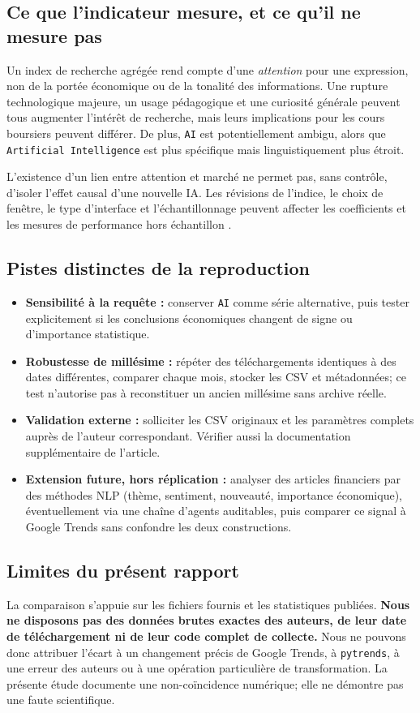 \documentclass[11pt,a4paper]{article}
\begin{document}
\subsection{Ce que l'indicateur mesure, et ce qu'il ne mesure pas}
Un index de recherche agrégée rend compte d'une \emph{attention} pour une expression, non de la portée économique ou de la tonalité des informations. Une rupture technologique majeure, un usage pédagogique et une curiosité générale peuvent tous augmenter l'intérêt de recherche, mais leurs implications pour les cours boursiers peuvent différer. De plus, \texttt{AI} est potentiellement ambigu, alors que \texttt{Artificial Intelligence} est plus spécifique mais linguistiquement plus étroit.

L'existence d'un lien entre attention et marché ne permet pas, sans contrôle, d'isoler l'effet causal d'une nouvelle IA. Les révisions de l'indice, le choix de fenêtre, le type d'interface et l'échantillonnage peuvent affecter les coefficients et les mesures de performance hors échantillon \cite{Cebrian2024,Misuse2025,Liu2024}.

\subsection{Pistes distinctes de la reproduction}
\begin{itemize}
\item \textbf{Sensibilité à la requête :} conserver \texttt{AI} comme série alternative, puis tester explicitement si les conclusions économiques changent de signe ou d'importance statistique.
\item \textbf{Robustesse de millésime :} répéter des téléchargements identiques à des dates différentes, comparer chaque mois, stocker les CSV et métadonnées; ce test n'autorise pas à reconstituer un ancien millésime sans archive réelle.
\item \textbf{Validation externe :} solliciter les CSV originaux et les paramètres complets auprès de l'auteur correspondant. Vérifier aussi la documentation supplémentaire de l'article.
\item \textbf{Extension future, hors réplication :} analyser des articles financiers par des méthodes NLP (thème, sentiment, nouveauté, importance économique), éventuellement via une chaîne d'agents auditables, puis comparer ce signal à Google Trends sans confondre les deux constructions.
\end{itemize}

\subsection{Limites du présent rapport}
La comparaison s'appuie sur les fichiers fournis et les statistiques publiées. \textbf{Nous ne disposons pas des données brutes exactes des auteurs, de leur date de téléchargement ni de leur code complet de collecte.} Nous ne pouvons donc attribuer l'écart à un changement précis de Google Trends, à \texttt{pytrends}, à une erreur des auteurs ou à une opération particulière de transformation. La présente étude documente une non-coïncidence numérique; elle ne démontre pas une faute scientifique.
\end{document}
